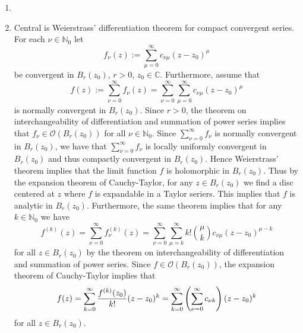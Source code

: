 \begin{enumerate}[label = \textbf{Exercise \arabic*.},wide = 0pt, itemsep=1.5ex]
	\item
	\item Central is Weierstrass' differentiation theorem for compact convergent series. For each $\nu \in \mathbb{N}_0$ let
		\begin{equation}
			f_\nu(z) := \sum_{\mu = 0}^\infty c_{\nu \mu}(z - z_0)^\mu
		\end{equation}
		\noindent be convergent in $B_r(z_0)$, $r > 0$, $z_0 \in \mathbb{C}$. Furthermore, assume that
		\begin{equation}
			f(z) := \sum_{\nu = 0}^\infty f_\nu(z) = \sum_{\nu = 0}^\infty \sum_{\mu = 0}^\infty c_{\nu \mu}(z - z_0)^\mu
		\end{equation}
		\noindent is normally convergent in $B_r(z_0)$. Since $r > 0$, the theorem on interchangeability of differentiation and summation of power series implies that $f_\nu \in \mathcal{O}(B_r(z_0))$ for all $\nu \in \mathbb{N}_0$. Since $\sum_{\nu = 0}^\infty f_\nu$ is normally convergent in $B_r(z_0)$, we have that $\sum_{\nu = 0}^\infty f_\nu$ is locally uniformly convergent in $B_r(z_0)$ and thus compactly convergent in $B_r(z_0)$. Hence Weierstrass' theorem implies that the limit function $f$ is holomorphic in $B_r(z_0)$. Thus by the expansion theorem of Cauchy-Taylor, for any $z \in B_r(z_0)$ we find a disc centered at $z$ where $f$ is expandable in a Taylor seriers. This implies that $f$ is analytic in $B_r(z_0)$. Furthermore, the same theorem implies that for any $k \in \mathbb{N}_0$ we have
		\begin{equation}
			f^{(k)}(z) = \sum_{\nu = 0}^\infty f_\nu^{(k)}(z) = \sum_{\nu = 0}^\infty \sum_{\mu = k}^\infty k! {\mu \choose k}c_{\nu \mu}(z - z_0)^{\mu - k} 
		\end{equation}
		\noindent for all $z \in B_r(z_0)$ by the theorem on interchangeability of differentiation and summation of power series. Since $f \in \mathcal{O}(B_r(z_0))$, the expansion theorem of Cauchy-Taylor implies that 
		\begin{equation}
			f(z) = \sum_{k = 0}^\infty \frac{f^{(k)}(z_0)}{k !} (z - z_0)^k = \sum_{k = 0}^\infty \del[4]{\sum_{\nu = 0}^\infty c_{\nu k}} (z - z_0)^k
		\end{equation}
		\noindent for all $z \in B_r(z_0)$.
\end{enumerate}
\printbibliography

